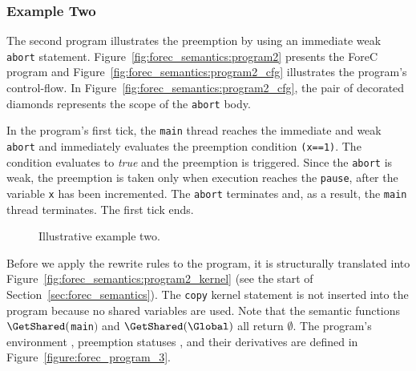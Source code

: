 \subsubsection{Example Two}
The second program illustrates the preemption by using an 
immediate weak \verb$abort$ statement. 
Figure~\ref{fig:forec_semantics:program2} presents
the ForeC program and Figure~\ref{fig:forec_semantics:program2_cfg}
illustrates the program's control-flow. In 
Figure~\ref{fig:forec_semantics:program2_cfg}, the
pair of decorated diamonds represents the scope of the 
\verb$abort$ body.

In the program's first tick, the \verb$main$ thread
reaches the immediate and weak \verb$abort$ and immediately
evaluates the preemption condition \verb$(x==1)$. The
condition evaluates to \emph{true} and the preemption is 
triggered. Since the \verb$abort$ is weak, the preemption
is taken only when execution reaches the \verb$pause$, after
the variable \verb$x$ has been incremented. The 
\verb$abort$ terminates and, as a result, the \verb$main$
thread terminates. The first tick ends.

\begin{figure}
	\centering
	
	\hfill
	\begin{minipage}{0.43\columnwidth}

	\end{minipage}
	\hspace{0.5cm}
	\begin{minipage}{0.28\columnwidth}
	\end{minipage}
	\hspace{1.5cm}

	\caption{Illustrative example two.}
\end{figure}

Before we apply the rewrite rules to the program, 
it is structurally translated into 
Figure~\ref{fig:forec_semantics:program2_kernel} 
(see the start of Section~\ref{sec:forec_semantics}).
The \verb$copy$ kernel statement is not inserted into
the program because no shared variables are used.
Note that the semantic functions $\GetShared($\verb$main$$)$ 
and $\GetShared(\Global)$ all return $\emptyset$.
The program's environment \Environment{}, preemption statuses \Abort{},
and their derivatives are defined in Figure~\ref{figure:forec_program_3}.
\newline

